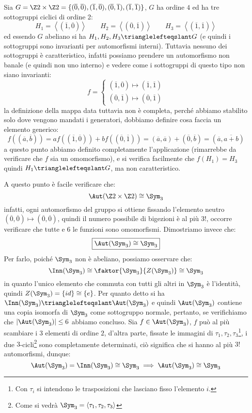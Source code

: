 \documentclass[11pt]{scrartcl}
\begin{document}
\begin{example}
    Sia $G = \Z2 \times \Z2 = \{(\overline 0, \overline 0),(\overline 1, \overline 0),(\overline 0, \overline 1),(\overline 1, \overline 1)\}$, $G$ ha ordine $4$ ed ha tre sottogruppi ciclici di ordine 2:
        \[ H_1 = \left<(\overline 1, \overline 0)\right> \qquad H_2 = \left<(\overline 0, \overline 1)\right> \qquad H_3 = \left<(\overline 1, \overline 1)\right>
            \] 
    ed essendo $G$ abeliano si ha $H_1,H_2,H_3 \trianglelefteqslant G$ (e quindi i sottogruppi sono invarianti per automorfismi interni). Tuttavia nessuno dei sottogruppi è caratteristico,
    infatti possiamo prendere un automorfismo non banale (e quindi non uno interno) e vedere come i sottogruppi di questo tipo non siano invarianti:
        \[ f = \begin{cases}
            (\overline 1, \overline 0) \longmapsto (\overline 1, \overline 1)\\
            (\overline 0, \overline 1) \longmapsto (\overline 0, \overline 1)
        \end{cases}
            \]
    la definizione della mappa data tuttavia non è completa, perché abbiamo stabilito solo dove vengono mandati i generatori, dobbiamo definire cosa faccia un elemento generico:
        \[ f ((\overline a, \overline b)) = af((\overline 1, \overline 0)) + bf((\overline 0, \overline 1)) = (\overline a, \overline a) + (\overline 0, \overline b) = (\overline a, \overline{a + b})
            \]
    a questo punto abbiamo definito completamente l'applicazione (rimarrebbe da verificare che $f$ sia un omomorfismo),  e si verifica facilmente che
     $f(H_1) = H_3 $ quindi $H_1 \trianglelefteqslant G$, ma non caratteristico.
\end{example}

A questo punto è facile verificare che:
    \[ \Aut(\Z2 \times \Z2) \cong \Sym_3
        \]
infatti, ogni automorfismo del gruppo si ottiene fissando l'elemento neutro $(\overline 0, \overline 0) \longmapsto (\overline 0, \overline 0)$, quindi il numero possibile di bigezioni è al più $3!$, occorre
verificare che tutte e $6$ le funzioni sono omomorfismi. Dimostriamo invece che:
    \[ \boxed{\Aut(\Sym_3) \cong \Sym_3}
        \]
Per farlo, poiché $\Sym_3$ non è abeliano, possiamo osservare che:
    \[ \Inn(\Sym_3) \cong \faktor{\Sym_3}{Z(\Sym_3)} \cong \Sym_3
        \]
in quanto l'unico elemento che commuta con tutti gli altri in $\Sym_3$ è l'identità, quindi $Z(\Sym_3) = \{id\} \cong \{e\}$.
Per quanto detto si ha $\Inn(\Sym_3) \trianglelefteqslant \Aut(\Sym_3)$ e quindi $\Aut(\Sym_3)$ contiene una copia isomorfa di $\Sym_3$ come sottogruppo normale, pertanto,
se verifichiamo che $|\Aut(\Sym_3)| \leq 6$ abbiamo concluso. Sia $f \in \Aut(\Sym_3)$, $f$ può al più scambiare i $3$ elementi di ordine $2$, d'altra parte, fissate le 
immagini di $\tau_1,\tau_2,\tau_3$\footnote{Con $\tau_i$ si intendono le trasposizioni che lasciano fisso l'elemento $i$.}, i due 
$3$-cicli\footnote{Come si vedrà $\Sym_3 = \left<\tau_1,\tau_2,\tau_3\right>$} sono completamente determinati,
ciò significa che si hanno al più $3!$ automorfismi, dunque:
    \[ \Aut(\Sym_3) = \Inn(\Sym_3) \cong \Sym_3 \implies \Aut(\Sym_3) \cong \Sym_3 
        \]
\end{document}
